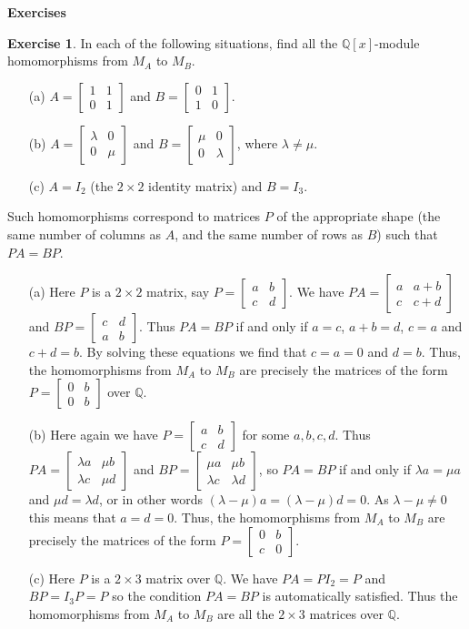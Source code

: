 \documentclass{amsart}
\newcommand{\bsm}       {\left[\begin{smallmatrix}}
\newcommand{\esm}       {\end{smallmatrix}\right]}
\newcommand{\Q}         {{\mathbb{Q}}}
\newcommand{\lm}        {\lambda}
\newcommand{\tm}        {\times}
\newcommand{\ip}[1]     {\langle #1\rangle}
\renewcommand{\:}{\colon}
\theoremstyle{definition}
\newtheorem{exercise}{Exercise}[section]
\renewenvironment{solution}{\SolutionAtEnd}{\endSolutionAtEnd}
\begin{document}

\begin{center}
 \Large \textbf{Exercises}
\end{center}

\begin{exercise}
 In each of the following situations, find all the $\Q[x]$-module
 homomorphisms from $M_A$ to $M_B$.
 \begin{itemize}
  \item[(a)] $A=\bsm 1&1\\0&1\esm$ and $B=\bsm 0&1\\1&0\esm$.
  \item[(b)] $A=\bsm \lm&0\\0&\mu\esm$ and $B=\bsm\mu&0\\0&\lm\esm$,
   where $\lm\neq\mu$.
  \item[(c)] $A=I_2$ (the $2\tm 2$ identity matrix) and $B=I_3$.
 \end{itemize} 
\end{exercise}
\begin{solution}
 Such homomorphisms correspond to matrices $P$ of the appropriate
 shape (the same number of columns as $A$, and the same number of rows
 as $B$) such that $PA=BP$.  
 \begin{itemize}
  \item[(a)] Here $P$ is a $2\tm 2$ matrix, say $P=\bsm a&b\\c&d\esm$.
   We have $PA=\bsm a&a+b\\c&c+d\esm$ and $BP=\bsm c&d\\a&b\esm$.  Thus
   $PA=BP$ if and only if $a=c$, $a+b=d$, $c=a$ and $c+d=b$.  By
   solving these equations we find that $c=a=0$ and $d=b$.  Thus, the
   homomorphisms from $M_A$ to $M_B$ are precisely the matrices of the
   form $P=\bsm 0&b\\0&b\esm$ over $\Q$.
  \item[(b)] Here again we have $P=\bsm a&b\\c&d\esm$ for some
   $a,b,c,d$.  Thus $PA=\bsm \lm a&\mu b\\ \lm c&\mu d\esm$ and
   $BP=\bsm\mu a&\mu b\\ \lm c&\lm d\esm$, so $PA=BP$ if and only if
   $\lm a=\mu a$ and $\mu d=\lm d$, or in other words
   $(\lm-\mu)a=(\lm-\mu)d=0$.  As $\lm-\mu\neq 0$ this means that
   $a=d=0$.  Thus, the homomorphisms from $M_A$ to $M_B$ are precisely
   the matrices of the form $P=\bsm 0&b\\ c&0\esm$.
  \item[(c)] Here $P$ is a $2\tm 3$ matrix over $\Q$.  We have
   $PA=PI_2=P$ and $BP=I_3P=P$ so the condition $PA=BP$ is
   automatically satisfied.  Thus the homomorphisms from $M_A$ to
   $M_B$ are all the $2\tm 3$ matrices over $\Q$.  
 \end{itemize}
\end{solution}
\end{document}
